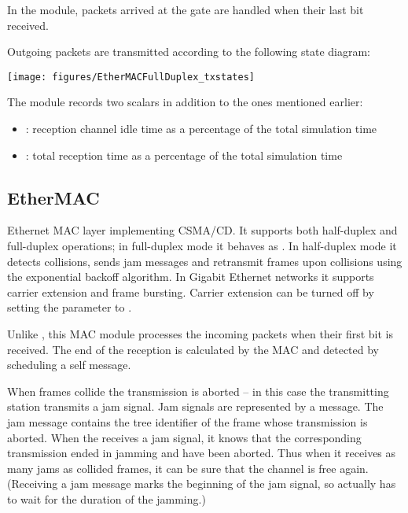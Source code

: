 
In the  module,
packets arrived at the  gate are handled when their last bit received.

Outgoing packets are transmitted according to the following state diagram:

\begin{center}
\texttt{[image: figures/EtherMACFullDuplex\_txstates]}
\end{center}

The  module records two scalars in addition to the
ones mentioned earlier:
\begin{itemize}
\item {}: reception channel idle time
        as a percentage of the total simulation time
\item {}: total reception
        time as a percentage of the total simulation time
\end{itemize}

\subsection{EtherMAC}

Ethernet MAC layer implementing CSMA/CD. It supports both half-duplex and full-duplex operations;
in full-duplex mode it behaves as . In half-duplex  mode
it detects collisions, sends jam messages and retransmit frames upon collisions using
the exponential backoff algorithm. In Gigabit Ethernet networks it supports carrier
extension and frame bursting. Carrier extension can be turned off by setting the
 parameter to .

Unlike , this MAC module processes the incoming packets when their
first bit is received. The end of the reception is calculated by the MAC and
detected by scheduling a self message.

When frames collide the transmission is aborted -- in this case the transmitting
station transmits a jam signal. Jam signals are represented
by a  message. The jam message contains the tree identifier
of the frame whose transmission is aborted. When the  receives a jam
signal, it knows that the corresponding transmission ended in jamming and have
been aborted. Thus when it receives as many jams as collided frames, it can
be sure that the channel is free again. (Receiving a jam message marks the
beginning of the jam signal, so actually has to wait for the duration of the jamming.)

